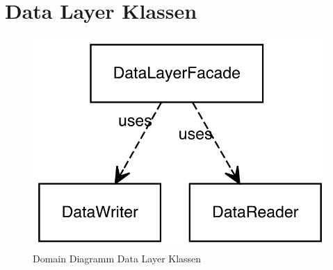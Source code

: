 \section{Data Layer Klassen}
\begin{figure}[H]
\centering
\includegraphics[width=1\textwidth]{../DomainDiagramms/DataLayer.png}
\caption{Domain Diagramm Data Layer Klassen}
\end{figure}
